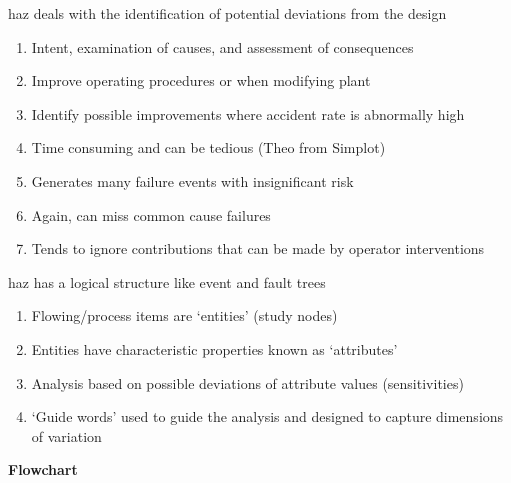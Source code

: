 \documentclass[aspectratio=1610,pdftex,dvipsnames,compress,xcolor={dvipsnames}]{beamer}
\newcommand{\acs}{\acrshort} %
\begin{document}
\begin{frame}{\acs{haz} deals with the identification of potential deviations from the design}
    \begin{enumerate}[series=outerlist,topsep=0pt,itemsep=17pt,leftmargin=*,label=(\arabic*)]
        \item[]Intent, examination of causes, and assessment of consequences
        \item[]Improve operating procedures or when modifying plant 
        \item[]Identify possible improvements where accident rate is abnormally high 
        \item[]Time consuming and can be tedious (Theo from Simplot)
        \item[]Generates many failure events with insignificant risk  
        \item[]Again, can miss common cause failures
        \item[]Tends to ignore contributions that can be made by operator interventions 
    \end{enumerate}
\end{frame}


\begin{frame}{\acs{haz} has a logical structure like event and fault trees}
    \begin{enumerate}[series=outerlist,topsep=0pt,itemsep=21pt,leftmargin=*,label=(\arabic*)]
        \item[]Flowing/process items are `entities' (study nodes)
        \item[]Entities have characteristic properties known as `attributes'
        \item[]Analysis based on possible deviations of attribute values (sensitivities)
        \item[]`Guide words' used to guide the analysis and designed to capture dimensions of variation
    \end{enumerate}
\end{frame}


\begin{frame}[plain]{}
    \centering\LARGE\textbf{Flowchart}
\end{frame}
\end{document}
